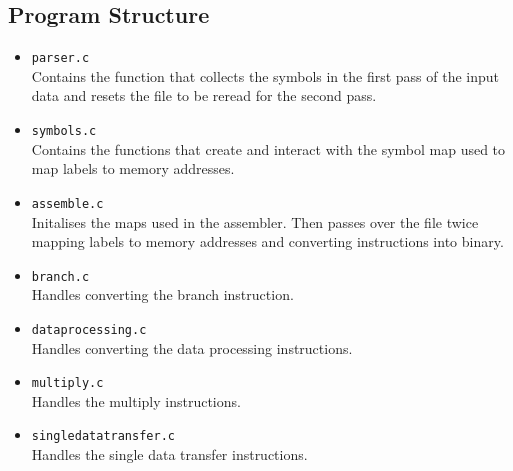 \documentclass[8pt]{article}
\begin{document}
\begin{minipage}{0.45\textwidth}
\subsection{Program Structure}

\begin{itemize}
    \item \texttt{parser.c} \\Contains the function that collects the symbols in the first pass of the
    input data and resets the file to be reread for the second pass.
    \item \texttt{symbols.c} \\Contains the functions that create and interact with the
    symbol map used to map labels to memory addresses.
    \item \texttt{assemble.c} \\Initalises the maps used in the assembler. Then 
    passes over the file twice mapping labels to memory addresses and converting
    instructions into binary.
    \item \texttt{branch.c} \\Handles converting the branch instruction.
    \item \texttt{dataprocessing.c} \\Handles converting the data processing
    instructions.
    \item \texttt{multiply.c} \\Handles the multiply instructions.
    \item \texttt{singledatatransfer.c} \\Handles the single data transfer instructions.
\end{itemize}
\end{minipage}%
\hfill
\end{document}
